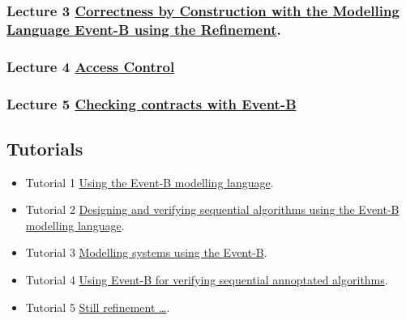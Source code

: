 \documentclass[ 12pt]{article}
\begin{document}
\subsubsection{Lecture 3 
    \href{http://mery54.github.io/teaching/mosos/lecturesnotes/masterillectcm3.pdf}{Correctness by Construction with the  
      Modelling Language Event-B using the Refinement}.}

  \subsubsection{ Lecture 4 
    \href{http://mery54.github.io/teaching/mosos/lecturesnotes/masterillectcm4.pdf}{Access 
      Control }}


\subsubsection{ Lecture 5
    \href{http://mery54.github.io/teaching/mosos/lecturesnotes/masterillectcm5.pdf}{Checking contracts with Event-B}}

      
  
\subsection{Tutorials}

  \begin{itemize}
  \item[]   Tutorial 1
    \href{http://mery54.github.io/teaching/mosos/lecturesnotes/master-tutorial1.pdf}{Using 
      the Event-B modelling language}.

     \item[]   Tutorial 2
    \href{http://mery54.github.io/teaching/mosos/lecturesnotes/master-tutorial2.pdf}{
      Designing and verifying sequential algorithms using the Event-B
      modelling language}.

        \item[]   Tutorial 3
    \href{http://mery54.github.io/teaching/mosos/lecturesnotes/master-tutorial3.pdf}{
      Modelling   systems  using the Event-B}.

   \item[]   Tutorial 4
    \href{http://mery54.github.io/teaching/mosos/lecturesnotes/master-tutorial4.pdf}{
      Using  Event-B  for  verifying sequential  annoptated algorithms}.


  
   \item[]   Tutorial 5
    \href{http://mery54.github.io/teaching/mosos/lecturesnotes/master-tutorial5.pdf}{
      Still refinement \ldots}.

  
    
  \end{itemize}
\end{document}
